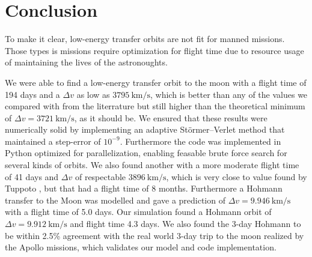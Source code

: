 \chapter{Conclusion}
To make it clear, low-energy transfer orbits are not fit for manned missions. Those types is missions require optimization for flight time due to resource usage of maintaining the lives of the astronoughts.

We were able to find a low-energy transfer orbit to the moon with a flight time of 194 days and a $\Delta v$ as low as $\SI{3795}{\km\per\s}$, which is better than any of the values we compared with from the literrature but still higher than the theoretical minimum of $\Delta v = \SI{3721}{\km\per\s}$, as it should be. We ensured that these results were numerically solid by implementing an adaptive Störmer–Verlet method that maintained a step-error of $10^{-9}$. Furthermore the code was implemented in Python optimized for parallelization, enabling feasable brute force search for several kinds of orbits. We also found another with a more moderate flight time of 41 days and $\Delta v$ of respectable $\SI{3896}{\km\per\s}$, which is very close to value found by Tuppoto \cite{Topputo2005}, but that had a flight time of 8 months. Furthermore a Hohmann transfer to the Moon was modelled and gave a prediction of $\Delta v = \SI{9.946}{\km\per\s}$ with a flight time of 5.0 days. Our simulation found a Hohmann orbit of $\Delta v = \SI{9.912}{\km\per\s}$ and flight time 4.3 days. We also found the 3-day Hohmann to be within 2.5\% agreement with the real world 3-day trip to the moon realized by the Apollo missions, which validates our model and code implementation.